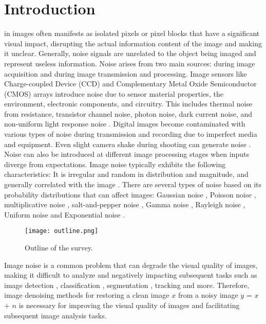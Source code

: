 \documentclass[conference]{IEEEtran}
\begin{document}
\section{Introduction}
 in images often manifests as isolated pixels or pixel blocks that have a significant visual impact, disrupting the actual information content of the image and making it unclear. Generally, noise signals are unrelated to the object being imaged and represent useless information. Noise arises from two main sources: during image acquisition and during image transmission and processing. Image sensors like Charge-coupled Device (CCD) and Complementary Metal Oxide Semiconductor (CMOS) arrays introduce noise due to sensor material properties, the environment, electronic components, and circuitry.  This includes thermal noise from resistance, transistor channel noise, photon noise, dark current noise, and non-uniform light response noise \cite{xu2010new, li2015low}. Digital images become contaminated with various types of noise \cite{henkelman1985measurement, wang2021electronic} during transmission and recording due to imperfect media and equipment. Even slight camera shake during shooting can generate noise \cite{liu2022shaking, komatsu2019effectiveness}. Noise can also be introduced at different image processing stages when inputs diverge from expectations. Image noise typically exhibits the following characteristics: It is irregular and random in distribution and magnitude, and generally correlated with the image \cite{boncelet2009image, zhao2014robust}.  
There are several types of noise based on its probability distributions that can affect images: Gaussian noise \cite{slepian1962one}, Poisson noise \cite{middleton1951theory}, multiplicative noise \cite{mcintyre1966multiplication}, salt-and-pepper noise \cite{cockayne1936dwarfism}, Gamma noise \cite{schultz1964shutdown}, Rayleigh noise \cite{ronken1969intensity}, Uniform noise \cite{eckart1953theory} and Exponential noise \cite{jerde1967effects}.

\begin{figure}[!t]
	\setlength{\abovecaptionskip}{0cm}
	\centering
	\texttt{[image: outline.png]}
	\caption{Outline of the survey.}
	\label{fig:1}
\vspace{-2em}
\end{figure}

Image noise is a common problem that can degrade the visual quality of images, making it difficult to analyze and negatively impacting subsequent tasks such as image detection \cite{yang2022deep,han2023ssgd, zhou2020automatically}, classification \cite{lu2023deep, xiang2022tkil}, segmentation \cite{wang2022adversarial, huang2022simultaneous, zhao2022automated, you2022incremental}, tracking \cite{lee2017online, tang2019moana} and more. Therefore, image denoising methods for restoring a clean image $x$ from a noisy image $y$ = $x$ + $n$ is necessary for improving the visual quality of images and facilitating subsequent image analysis tasks.
\end{document}

